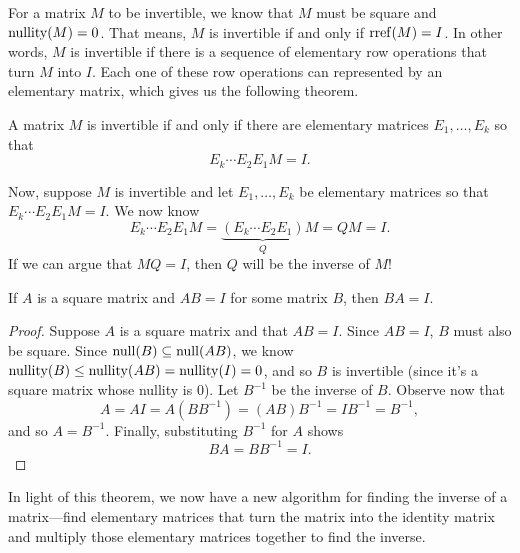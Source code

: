 For a matrix $M$ to be invertible, we know that $M$ must be square and $\operatorname{nullity}(M)=0$. That means,
$M$ is invertible if and only if $\operatorname{rref}(M)=I$. In other words, $M$ is invertible if there is a sequence of elementary row operations
that turn $M$ into $I$. Each one of these row operations can represented by an elementary matrix, which gives us the
following theorem.

\begin{theorem}
	A matrix $M$ is invertible if and only if there are elementary matrices $E_1,\ldots, E_k$ so that
	\[
		E_k\cdots E_2E_1M=I.
	\]
\end{theorem}

Now, suppose $M$ is invertible and let $E_1,\ldots,E_k$ be elementary matrices so that $E_k\cdots E_2E_1M=I$. We now know
\[
	E_k\cdots E_2E_1M=\underbrace{(E_k\cdots E_2E_1)}_QM=QM=I.
\]
If we can argue that $MQ=I$, then $Q$ will be the inverse of $M$!

\begin{theorem}
	If $A$ is a square matrix and $AB=I$ for some matrix $B$, then
	$BA=I$.
\end{theorem}
\begin{proof}
	Suppose $A$ is a square matrix and that $AB=I$. Since $AB=I$, $B$ must also be square.
	Since $\operatorname{null}(B)\subseteq\operatorname{null}(AB)$, we know $\operatorname{nullity}(B)\leq \operatorname{nullity}(AB)=\operatorname{nullity}(I)=0$, 
	and so $B$ is invertible (since it's a square matrix whose nullity is $0$). Let $B^{-1}$
	be the inverse of $B$. Observe now that
	\[
		A=AI=A(BB^{-1})=(AB)B^{-1}=IB^{-1}=B^{-1},
	\]
	and so $A=B^{-1}$. Finally, substituting $B^{-1}$ for $A$ shows
	\[
		BA=BB^{-1}=I.
	\]
\end{proof}

In light of this theorem, we now have a new algorithm for finding the inverse of a matrix---find
elementary matrices that turn the matrix into the identity matrix and multiply those elementary
matrices together to find the inverse.

